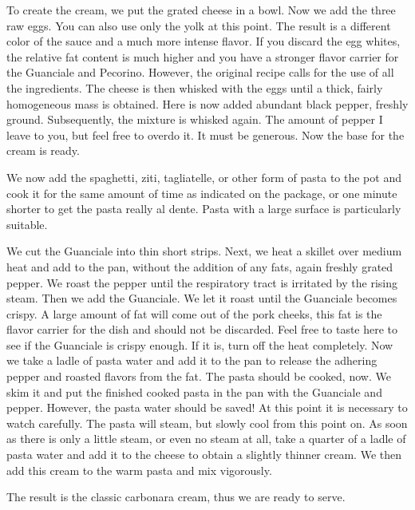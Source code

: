 To create the cream, we put the grated cheese in a bowl. Now we add the three raw eggs. You can also use only the yolk at this point. The result is a different color of the sauce and a much more intense flavor. If you discard the egg whites, the relative fat content is much higher and you have a stronger flavor carrier for the Guanciale and Pecorino. However, the original recipe calls for the use of all the ingredients. The cheese is then whisked with the eggs until a thick, fairly homogeneous mass is obtained. Here is now added abundant black pepper, freshly ground. Subsequently, the mixture is whisked again. The amount of pepper I leave to you, but feel free to overdo it. It must be generous. Now the base for the cream is ready.

We now add the spaghetti, ziti, tagliatelle, or other form of pasta to the pot and cook it for the same amount of time as indicated on the package, or one minute shorter to get the pasta really al dente. Pasta with a large surface is particularly suitable.

We cut the Guanciale into thin short strips. Next, we heat a skillet over medium heat and add to the pan, without the addition of any fats, again freshly grated pepper. We roast the pepper until the respiratory tract is irritated by the rising steam. Then we add the Guanciale. We let it roast until the Guanciale becomes crispy. A large amount of fat will come out of the pork cheeks, this fat is the flavor carrier for the dish and should not be discarded. Feel free to taste here to see if the Guanciale is crispy enough. If it is, turn off the heat completely. Now we take a ladle of pasta water and add it to the pan to release the adhering pepper and roasted flavors from the fat. The pasta should be cooked, now. We skim it and put the finished cooked pasta in the pan with the Guanciale and pepper. However, the pasta water should be saved! At this point it is necessary to watch carefully. The pasta will steam, but slowly cool from this point on. As soon as there is only a little steam, or even no steam at all, take a quarter of a ladle of pasta water and add it to the cheese to obtain a slightly thinner cream. We then add this cream to the warm pasta and mix vigorously.

The result is the classic carbonara cream, thus we are ready to serve.

